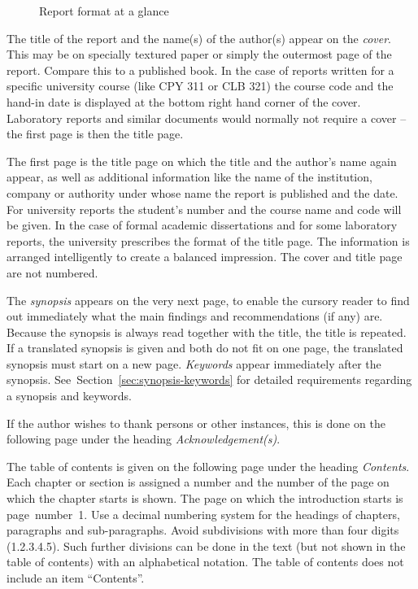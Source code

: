 \documentclass[a5paper, 10pt]{article}
\newcommand{\subsectionname}[1]{\emph{#1}}
\begin{document}
\begin{figure}[htbp]
  \caption{Report format at a glance}
  \label{fig:reportformatsummary}
\end{figure}

The title of the report and the name(s) of the author(s) appear on the
\emph{cover}. This may be on specially textured paper or simply the
outermost page of the report.  Compare this to a published book.  In
the case of reports written for a specific university course (like CPY
311 or CLB 321) the course code and the hand-in date is displayed at
the bottom right hand corner of the cover.  Laboratory reports and
similar documents would normally not require a cover -- the first page
is then the title page.

The first page is the title page on which the title and the author's
name again appear, as well as additional information like the name of
the institution, company or authority under whose name the report is
published and the date.  For university reports the student's number
and the course name and code will be given.  In the case of formal
academic dissertations and for some laboratory reports, the university
prescribes the format of the title page.  The information is arranged
intelligently to create a balanced impression.  The cover and title
page are not numbered.

The \subsectionname{synopsis} appears on the very next page, to enable
the cursory reader to find out immediately what the main findings and
recommendations (if any) are.  Because the synopsis is always read
together with the title, the title is repeated.  If a translated
synopsis is given and both do not fit on one page, the translated
synopsis must start on a new page.
\subsectionname{Keywords} appear immediately after
the synopsis.  See~Section~\ref{sec:synopsis-keywords} for detailed
requirements regarding a synopsis and keywords.

If the author wishes to thank persons or other instances, this is done
on the following page under the
heading \subsectionname{Acknowledgement(s)}.

The table of contents is given on the following page under the heading
\subsectionname{Contents}.  Each chapter or section is assigned a number and the number
of the page on which the chapter starts is shown.  The page on which
the introduction starts is page~number~1.  Use a decimal numbering
system for the headings of chapters, paragraphs and sub-paragraphs.
Avoid subdivisions with more than four digits (1.2.3.4.5).  Such
further divisions can be done in the text (but not shown in the table
of contents) with an alphabetical notation. The table of contents does
not include an item ``Contents''.
\end{document}
